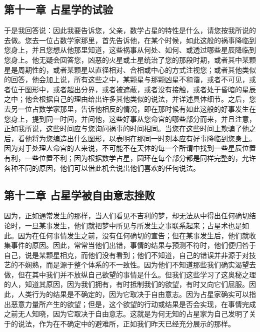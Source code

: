 
\subsection{第十一章 占星学的试验}

于是我回答说：因此我要告诉您，父亲，数学占星的特性是什么，请您按我所说的去做。您去一位占数学家那里，首先告诉他，在某个时候，如此这般的祸事降临到您身上，并且您想从他那里知道，这些祸事从何处、如何、或透过哪些星辰降临到您身上。他无疑会回答您，凶恶的火星或土星统治了您的那段时期，或者其中某颗星是周期性的，或者某颗星以直径相对、合相或中心的方式注视您；或者其他类似的回答，他会加上说，所有这些之中，某颗星与那颗凶星不和谐，或者不可见，或者位于图形中，或者超出分界，或者被遮蔽，或者没有接触，或者处于昏暗的星辰之中；他会根据自己的理由给出许多其他类似的说法，并详述具体细节。之后，您去另一位占数学家那里，告诉他相反的情况，即在那时候有如此这般的好事发生在您身上，提到同一时间，并问他，这些好事从您命宫的哪些部分而来，并且注意，正如我所说，这些时间应与您询问祸事的时间相同。当您在这些时间上欺骗了他之后，看他将为您编造出什么图形，以表明在那同一时刻本应有好事降临到您身上。因为对于处理人命宫的人来说，不可能不在天体的每一个所谓中找到一些星辰位置有利，一些位置不利；因为根据数学占星，圆环在每个部分都是同样完整的，允许各种不同的原因，他们可以借此机会说出他们喜欢的任何说法。\par


\subsection{第十二章 占星学被自由意志挫败}

因为，正如通常发生的那样，当人们看见不吉利的梦，却无法从中得出任何确切结论时，一旦某事发生，他们就把梦中所见与所发生之事联系起来；占星术也是如此。因为在任何事情发生之前，没有任何确切的宣告；但在某事发生后，他们就收集事件的原因。因此，常常当他们出错，事情的结果与预测不符时，他们便归咎于自己，说是某颗星相克，而他们没有看到；他们不知道，自己的错误并非源于对技艺的不娴熟，而是源于整个体系的不一致性。因为他们不知道那些我们确实渴望去做，但在其中我们并不放纵自己欲望的事情是什么。但我们这些学习了这奥秘之理的人，知道其原因，因为我们拥有，有时抵制我们的欲望，有时又向它们屈服。因此，人类行为的结果是不确定的，因为它取决于自由意志。因为占星家确实可以指出恶意力量所产生的欲望；但是，这个欲望的行动或结果是否会实现，在事情完成之前无人知晓，因为它取决于自由意志。这就是为何无知的占星家为自己发明了关于的说法，作为在不确定中的避难所，正如我们昨天已经充分展示的那样。\par

